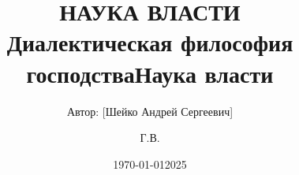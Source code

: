 \documentclass[12pt,a4paper]{book}
\title{\Huge \textbf{НАУКА ВЛАСТИ} \\ \Large \vspace{1em} Диалектическая философия господства}
\author{Автор: [Шейко Андрей Сергеевич]}
\date{\today}
\begin{document}
\maketitle
\tableofcontents
\newpage

\frontmatter
\title{Наука власти}
\author{Г.В.}
\date{2025}
\maketitle
\tableofcontents

\mainmatter



























\backmatter
\printbibliography
\end{document}
